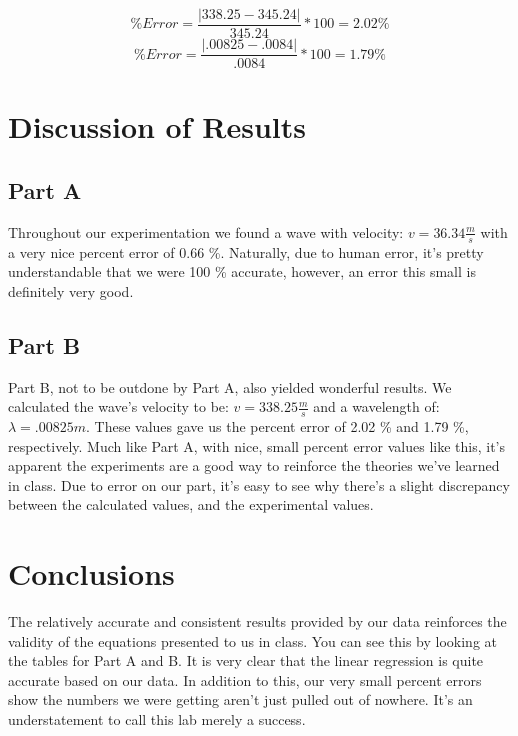 \documentclass[titlepage]{article}
\begin{document}
\[
	\% Error = \frac{|338.25 - 345.24|}{345.24} * 100 = 2.02\%
\]
\[
	\% Error = \frac{|.00825 - .0084|}{.0084} * 100 = 1.79\%
\]

\section{Discussion of Results}\label{sec:discussion_of_results}
\subsection{Part A}\label{sub:part_a}
Throughout our experimentation we found a wave with velocity: $v = 36.34 \frac{m}{s}$ with a very nice percent error of 0.66 \%. Naturally, due to human error, it's pretty understandable that we were 100 \% accurate, however, an error this small is definitely very good.

\subsection{Part B}\label{sub:part_b}
Part B, not to be outdone by Part A, also yielded wonderful results. We calculated the wave's velocity to be: $v = 338.25 \frac{m}{s}$ and a wavelength of: $\lambda = .00825 m$. These values gave us the percent error of 2.02 \% and 1.79 \%, respectively. Much like Part A, with nice, small percent error values like this, it's apparent the experiments are a good way to reinforce the theories we've learned in class. Due to error on our part, it's easy to see why there's a slight discrepancy between the calculated values, and the experimental values.

\section{Conclusions}\label{sec:conclusions}
The relatively accurate and consistent results provided by our data reinforces the validity of the equations presented to us in class. You can see this by looking at the tables for Part A and B. It is very clear that the linear regression is quite accurate based on our data. In addition to this, our very small percent errors show the numbers we were getting aren't just pulled out of nowhere. It's an understatement to call this lab merely a success.
\end{document}
